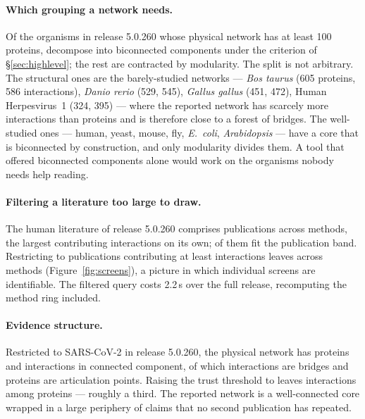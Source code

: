 \documentclass[conference]{IEEEtran}
\begin{document}
\begin{table}[t]
  \caption{Contracting the human interactome, opening the largest module each time.
  Generated by the figure pipeline rather than transcribed.}
  \label{tab:drilldown}
  \centering
  \small
  
\end{table}

\paragraph{Which grouping a network needs.} Of the \OrganismsSurveyed{} organisms in
release 5.0.260 whose physical network has at least 100 proteins,
\OrganismsStructural{} decompose into biconnected components under the criterion of
\S\ref{sec:highlevel}; the rest are contracted by modularity. The split is not
arbitrary. The structural ones are the barely-studied networks --- \emph{Bos taurus}
(605 proteins, 586 interactions), \emph{Danio rerio} (529, 545), \emph{Gallus gallus}
(451, 472), Human Herpesvirus~1 (324, 395) --- where the reported network has scarcely
more interactions than proteins and is therefore close to a forest of bridges. The
well-studied ones --- human, yeast, mouse, fly, \emph{E.~coli}, \emph{Arabidopsis} ---
have a core that is biconnected by construction, and only modularity divides them. A
tool that offered biconnected components alone would work on the organisms nobody
needs help reading.

\paragraph{Filtering a literature too large to draw.} The human literature of release
5.0.260 comprises \HumanPublications{} publications across \HumanMethods{} methods, the
largest contributing \HumanBiggestPublication{} interactions on its own;
\HumanPublicationsDrawn{} of them fit the publication band. Restricting to publications
contributing at least \ScreenCut{} interactions leaves \ScreenPublications{} across
\ScreenMethods{} methods (Figure~\ref{fig:screens}), a picture in which individual
screens are identifiable. The filtered query costs 2.2\,s over the full release,
recomputing the method ring included.

\paragraph{Evidence structure.} Restricted to SARS-CoV-2 in release 5.0.260, the
physical network has \CovProteins{} proteins and \CovInteractions{} interactions in
\CovComponents{} connected component, of which \CovBridges{} interactions are bridges
and \CovArticulation{} proteins are articulation points. Raising the trust threshold to
\CovThreshold{} leaves \CovThresholdInteractions{} interactions among
\CovThresholdProteins{} proteins --- roughly a third. The reported network is a
well-connected core wrapped in a large periphery of claims that no second publication
has repeated.
\end{document}
